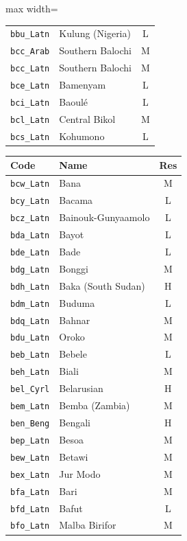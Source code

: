 {\begin{adjustbox}{max width=\textwidth}
\begin{tabular}{llc}
        \texttt{bbu\_Latn} & Kulung (Nigeria) & L \\
        \texttt{bcc\_Arab} & Southern Balochi & M \\
        \texttt{bcc\_Latn} & Southern Balochi & M \\
        \texttt{bce\_Latn} & Bamenyam & L \\
        \texttt{bci\_Latn} & Baoulé & L \\
        \texttt{bcl\_Latn} & Central Bikol & M \\
        \texttt{bcs\_Latn} & Kohumono & L \\
        \bottomrule
    \end{tabular}
    \quad
    \begin{tabular}{llc}
        \toprule
        \textbf{Code} & \textbf{Name} & \textbf{Res}\\
        \midrule
        \texttt{bcw\_Latn} & Bana & M \\
        \texttt{bcy\_Latn} & Bacama & L \\
        \texttt{bcz\_Latn} & Bainouk-Gunyaamolo & L \\
        \texttt{bda\_Latn} & Bayot & L \\
        \texttt{bde\_Latn} & Bade & L \\
        \texttt{bdg\_Latn} & Bonggi & M \\
        \texttt{bdh\_Latn} & Baka (South Sudan) & H \\
        \texttt{bdm\_Latn} & Buduma & L \\
        \texttt{bdq\_Latn} & Bahnar & M \\
        \texttt{bdu\_Latn} & Oroko & M \\
        \texttt{beb\_Latn} & Bebele & L \\
        \texttt{beh\_Latn} & Biali & M \\
        \texttt{bel\_Cyrl} & Belarusian & H \\
        \texttt{bem\_Latn} & Bemba (Zambia) & M \\
        \texttt{ben\_Beng} & Bengali & H \\
        \texttt{bep\_Latn} & Besoa & M \\
        \texttt{bew\_Latn} & Betawi & M \\
        \texttt{bex\_Latn} & Jur Modo & M \\
        \texttt{bfa\_Latn} & Bari & M \\
        \texttt{bfd\_Latn} & Bafut & L \\
        \texttt{bfo\_Latn} & Malba Birifor & M \\

\end{tabular}
\end{adjustbox}}
